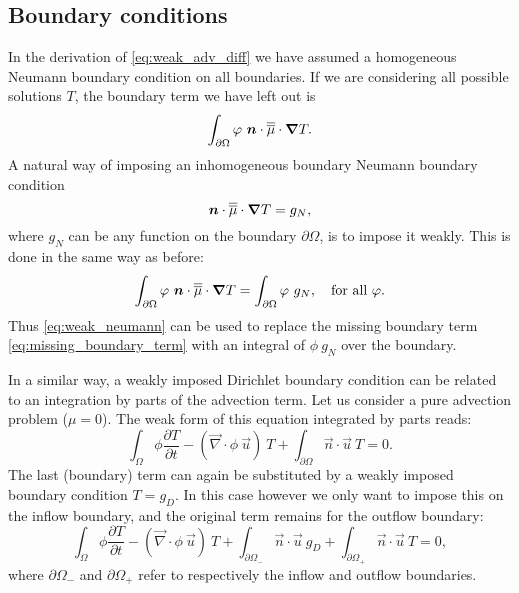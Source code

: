 \subsection{Boundary conditions}
In the derivation of \eqref{eq:weak_adv_diff} we have assumed a homogeneous Neumann 
boundary condition on all boundaries. If we are considering all possible 
solutions $T$, the boundary term we have left out is
\begin{equation}\label{eq:missing_boundary_term}
  \int_{\partial\Omega} \varphi~{\mbox{\boldmath$n$}}\cdot\overline{\overline{\mu}}\cdot{\mbox{\boldmath$\nabla$}} T.
\end{equation}
A natural way of imposing an inhomogeneous boundary Neumann boundary condition
\begin{equation*}
  {\mbox{\boldmath$n$}}\cdot\overline{\overline{\mu}}\cdot{\mbox{\boldmath$\nabla$}} T=g_N,
\end{equation*}
where $g_N$ can be any function on the boundary $\partial\Omega$, is to impose it 
weakly. This is done in the same way as before:
\begin{equation}\label{eq:weak_neumann}
  \int_{\partial\Omega} \varphi~{\mbox{\boldmath$n$}}\cdot\overline{\overline{\mu}}\cdot{\mbox{\boldmath$\nabla$}} T=
    \int_{\partial\Omega} \varphi~g_N, \quad \text{for all }\varphi.
\end{equation}
Thus \eqref{eq:weak_neumann} can be used to replace the missing 
boundary term \eqref{eq:missing_boundary_term} with an integral of $\phi~g_N$ 
over the boundary.

In a similar way, a weakly imposed Dirichlet boundary condition can be related to an 
integration by parts of the advection term. Let us consider a pure advection problem 
($\mu=0$). The weak form of this equation integrated by parts reads:
\begin{equation*}
  \int_\Omega \phi \frac{\partial T}{\partial t} -
    \left(\vec{\nabla}\cdot \phi~\vec{u}\right)~T +
    \int_{\partial\Omega} \vec{n}\cdot\vec{u}~T
    = 0.
\end{equation*}
The last (boundary) term can again be substituted by a weakly imposed boundary condition $T=g_D$.
In this case however we only want to impose this on the inflow boundary, and the original term
remains for the outflow boundary:
\begin{equation}\label{eq:adv_integrated_by_parts}  
  \int_\Omega \phi \frac{\partial T}{\partial t} -
    \left(\vec{\nabla}\cdot \phi~\vec{u}\right)~T +
    \int_{\partial\Omega_-} \vec{n}\cdot\vec{u}~g_D +
    \int_{\partial\Omega_+} \vec{n}\cdot\vec{u}~T
    = 0,
\end{equation}
where $\partial\Omega_-$ and $\partial\Omega_+$ refer to respectively 
the inflow and outflow boundaries.

